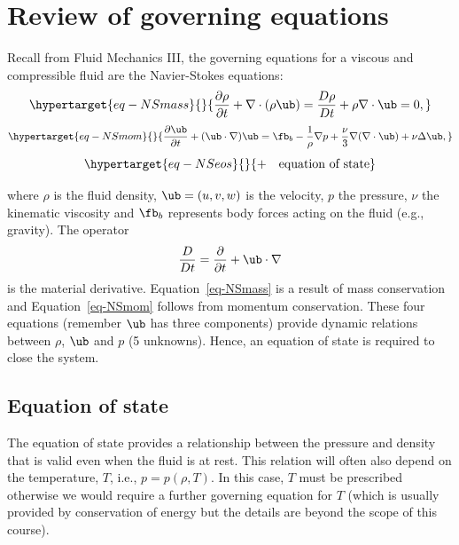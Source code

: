 \documentclass[
  letterpaper,
  twocolumn,
  landscape]{report}
\begin{document}
\hypertarget{review-of-governing-equations}{%
\section{Review of governing
equations}\label{review-of-governing-equations}}

Recall from Fluid Mechanics III, the governing equations for a viscous
and compressible fluid are the Navier-Stokes equations:
\begin{equation}\protect\hypertarget{eq-NSmass}{}{
\frac{\partial\rho}{\partial t} + \nabla\cdot(\rho\ub) = \frac{D\rho}{Dt} + \rho\nabla\cdot\ub =0, 
}\label{eq-NSmass}\end{equation}
\begin{equation}\protect\hypertarget{eq-NSmom}{}{
\frac{\partial\ub}{\partial t} + (\ub\cdot\nabla)\ub = \fb_b -\frac{1}{\rho}\nabla p+\frac{\nu}{3}\nabla(\nabla\cdot\ub) + \nu\Delta\ub,}\label{eq-NSmom}\end{equation}
\begin{equation}\protect\hypertarget{eq-NSeos}{}{+ \quad \text{equation of state}}\label{eq-NSeos}\end{equation}

where \(\rho\) is the fluid density, \(\ub=(u,v,w)\) is the velocity,
\(p\) the pressure, \(\nu\) the kinematic viscosity and \(\fb_{b}\)
represents body forces acting on the fluid (e.g., gravity). The operator
\[
    \frac{D}{Dt} = \frac{\partial }{\partial t} +\ub \cdot \nabla
\] is the material derivative. Equation~\ref{eq-NSmass} is a result of
mass conservation and Equation~\ref{eq-NSmom} follows from momentum
conservation. These four equations (remember \(\ub\) has three
components) provide dynamic relations between \(\rho\), \(\ub\) and
\(p\) (5 unknowns). Hence, an equation of state is required to close the
system.

\hypertarget{equation-of-state}{%
\subsection{Equation of state}\label{equation-of-state}}

The equation of state provides a relationship between the pressure and
density that is valid even when the fluid is at rest. This relation will
often also depend on the temperature, \(T\), i.e., \(p=p(\rho,T)\). In
this case, \(T\) must be prescribed otherwise we would require a further
governing equation for \(T\) (which is usually provided by conservation
of energy but the details are beyond the scope of this course).
\end{document}
